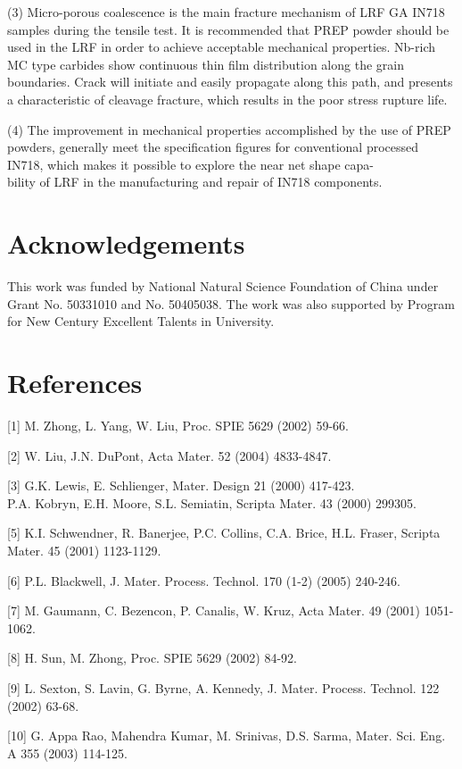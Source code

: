 \documentclass[10pt]{article}
\begin{document}
(3) Micro-porous coalescence is the main fracture mechanism of LRF GA IN718 samples during the tensile test. It is recommended that PREP powder should be used in the LRF in order to achieve acceptable mechanical properties. Nb-rich MC type carbides show continuous thin film distribution along the grain boundaries. Crack will initiate and easily propagate along this path, and presents a characteristic of cleavage fracture, which results in the poor stress rupture life.

(4) The improvement in mechanical properties accomplished by the use of PREP powders, generally meet the specification figures for conventional processed IN718, which makes it possible to explore the near net shape capa-\\
bility of LRF in the manufacturing and repair of IN718 components.

\section*{Acknowledgements}
This work was funded by National Natural Science Foundation of China under Grant No. 50331010 and No. 50405038. The work was also supported by Program for New Century Excellent Talents in University.

\section*{References}
[1] M. Zhong, L. Yang, W. Liu, Proc. SPIE 5629 (2002) 59-66.

[2] W. Liu, J.N. DuPont, Acta Mater. 52 (2004) 4833-4847.

[3] G.K. Lewis, E. Schlienger, Mater. Design 21 (2000) 417-423.\\
[4] P.A. Kobryn, E.H. Moore, S.L. Semiatin, Scripta Mater. 43 (2000) 299305.

[5] K.I. Schwendner, R. Banerjee, P.C. Collins, C.A. Brice, H.L. Fraser, Scripta Mater. 45 (2001) 1123-1129.

[6] P.L. Blackwell, J. Mater. Process. Technol. 170 (1-2) (2005) 240-246.

[7] M. Gaumann, C. Bezencon, P. Canalis, W. Kruz, Acta Mater. 49 (2001) 1051-1062.

[8] H. Sun, M. Zhong, Proc. SPIE 5629 (2002) 84-92.

[9] L. Sexton, S. Lavin, G. Byrne, A. Kennedy, J. Mater. Process. Technol. 122 (2002) 63-68.

[10] G. Appa Rao, Mahendra Kumar, M. Srinivas, D.S. Sarma, Mater. Sci. Eng. A 355 (2003) 114-125.
\end{document}
